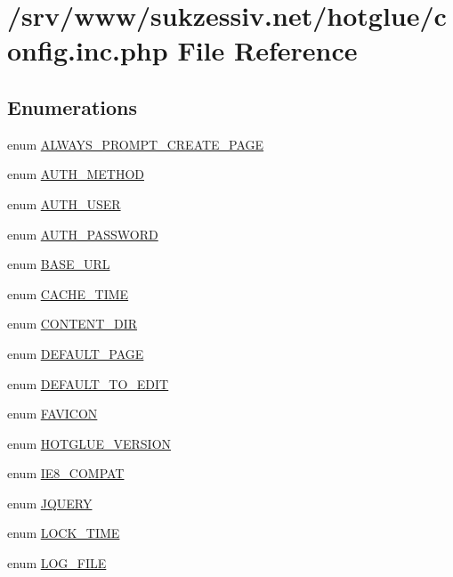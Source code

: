 \hypertarget{config_8inc_8php}{
\section{/srv/www/sukzessiv.net/hotglue/config.inc.php File Reference}
\label{config_8inc_8php}
}
\subsection*{Enumerations}
\begin{DoxyCompactItemize}
\item 
enum \hyperlink{config_8inc_8php_af7115c186e2e18cb1839aed9d163b31a}{ALWAYS\_\-PROMPT\_\-CREATE\_\-PAGE} 
\item 
enum \hyperlink{config_8inc_8php_a2ee7e30fa45253c5e303994703d3293f}{AUTH\_\-METHOD} 
\item 
enum \hyperlink{config_8inc_8php_a7d3a74ff015a9f789a5a2e554a9fa956}{AUTH\_\-USER} 
\item 
enum \hyperlink{config_8inc_8php_adf2112da607b39714ba9cca31b42a93a}{AUTH\_\-PASSWORD} 
\item 
enum \hyperlink{config_8inc_8php_a16548ab75ed30cbddce178d56d26dbb8}{BASE\_\-URL} 
\item 
enum \hyperlink{config_8inc_8php_afc454c0433a87811735836800fe3350b}{CACHE\_\-TIME} 
\item 
enum \hyperlink{config_8inc_8php_a9949c9013641bf07cd112607d200d6ff}{CONTENT\_\-DIR} 
\item 
enum \hyperlink{config_8inc_8php_a4208e17d37801abf0982b2d1e625a8f2}{DEFAULT\_\-PAGE} 
\item 
enum \hyperlink{config_8inc_8php_a3b22c0132666a0112334ed38a21de8ce}{DEFAULT\_\-TO\_\-EDIT} 
\item 
enum \hyperlink{config_8inc_8php_afd55d95ee6651060397404533516882a}{FAVICON} 
\item 
enum \hyperlink{config_8inc_8php_a7c35565a4692ae46fd1c04340f4f1ca9}{HOTGLUE\_\-VERSION} 
\item 
enum \hyperlink{config_8inc_8php_a1d76a949b348522c90864da5df468d51}{IE8\_\-COMPAT} 
\item 
enum \hyperlink{config_8inc_8php_a5c2fff7e41a0380fb7872627e3a14a29}{JQUERY} 
\item 
enum \hyperlink{config_8inc_8php_a924ae40271cc363050158e36b3823407}{LOCK\_\-TIME} 
\item 
enum \hyperlink{config_8inc_8php_a6de83433b64b24349644a4c2d839dcb7}{LOG\_\-FILE} 

\end{DoxyCompactItemize}
